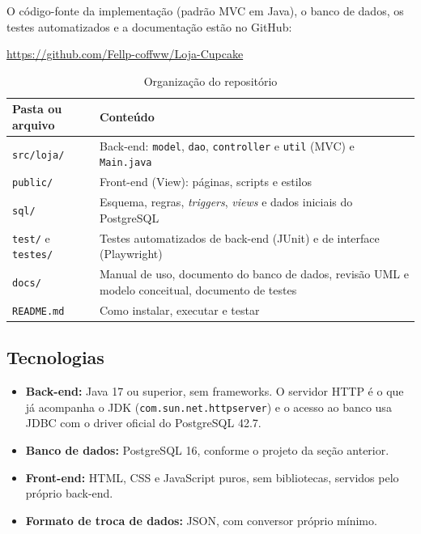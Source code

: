 \documentclass[12pt]{article}
\begin{document}
O código-fonte da implementação (padrão MVC em Java), o banco de dados, os testes automatizados e a documentação estão no GitHub:

\begin{center}\url{https://github.com/Fellp-coffww/Loja-Cupcake}\end{center}

\begin{table}[H]
\centering\small\renewcommand{\arraystretch}{1.3}
\begin{tabular}{|p{4.2cm}|p{9.4cm}|}
\hline
\rowcolor{gray!40} \textbf{Pasta ou arquivo} & \textbf{Conteúdo} \\ \hline
\texttt{src/loja/} & Back-end: \texttt{model}, \texttt{dao}, \texttt{controller} e \texttt{util} (MVC) e \texttt{Main.java} \\ \hline
\texttt{public/} & Front-end (View): páginas, scripts e estilos \\ \hline
\texttt{sql/} & Esquema, regras, \textit{triggers}, \textit{views} e dados iniciais do PostgreSQL \\ \hline
\texttt{test/} e \texttt{testes/} & Testes automatizados de back-end (JUnit) e de interface (Playwright) \\ \hline
\texttt{docs/} & Manual de uso, documento do banco de dados, revisão UML e modelo conceitual, documento de testes \\ \hline
\texttt{README.md} & Como instalar, executar e testar \\ \hline
\end{tabular}
\caption{Organização do repositório}
\end{table}

\subsection{Tecnologias}

\begin{itemize}
\item \textbf{Back-end:} Java 17 ou superior, sem frameworks. O servidor HTTP é o que já acompanha o JDK (\texttt{com.sun.net.httpserver}) e o acesso ao banco usa JDBC com o driver oficial do PostgreSQL 42.7.
\item \textbf{Banco de dados:} PostgreSQL 16, conforme o projeto da seção anterior.
\item \textbf{Front-end:} HTML, CSS e JavaScript puros, sem bibliotecas, servidos pelo próprio back-end.
\item \textbf{Formato de troca de dados:} JSON, com conversor próprio mínimo.
\end{itemize}
\end{document}
